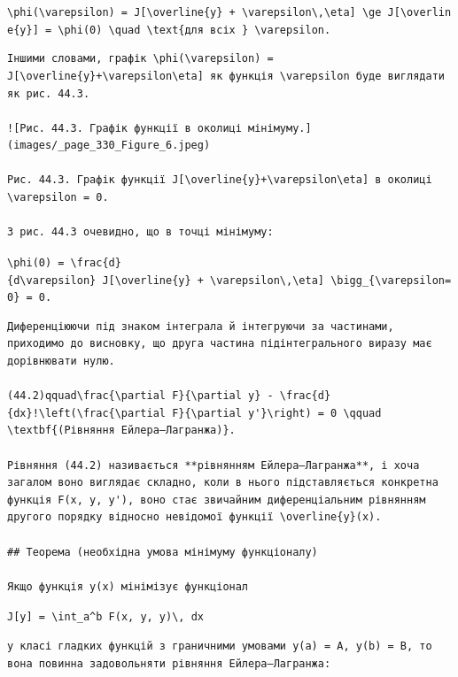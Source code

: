 \documentclass[
  ukrainian,
]{article}
\begin{document}
\texttt{\textbackslash{}phi(\textbackslash{}varepsilon)\ =\ J{[}\textbackslash{}overline\{y\}\ +\ \textbackslash{}varepsilon\textbackslash{},\textbackslash{}eta{]}\ \textbackslash{}ge\ J{[}\textbackslash{}overline\{y\}{]}\ =\ \textbackslash{}phi(0)\ \textbackslash{}quad\ \textbackslash{}text\{для\ всіх\ \}\ \textbackslash{}varepsilon.}

\begin{verbatim}
Іншими словами, графік \phi(\varepsilon) = J[\overline{y}+\varepsilon\eta] як функція \varepsilon буде виглядати як рис. 44.3.

![Рис. 44.3. Графік функції в околиці мінімуму.](images/_page_330_Figure_6.jpeg)

Рис. 44.3. Графік функції J[\overline{y}+\varepsilon\eta] в околиці \varepsilon = 0.

З рис. 44.3 очевидно, що в точці мінімуму:
\end{verbatim}

\texttt{\textbackslash{}phi\textquotesingle{}(0)\ =\ \textbackslash{}frac\{d\}\{d\textbackslash{}varepsilon\}\ J{[}\textbackslash{}overline\{y\}\ +\ \textbackslash{}varepsilon\textbackslash{},\textbackslash{}eta{]}\ \textbackslash{}bigg\textbar{}\_\{\textbackslash{}varepsilon=0\}\ =\ 0.}

\begin{verbatim}
Диференціюючи під знаком інтеграла й інтегруючи за частинами, приходимо до висновку, що друга частина підінтегрального виразу має дорівнювати нулю.

(44.2)qquad\frac{\partial F}{\partial y} - \frac{d}{dx}!\left(\frac{\partial F}{\partial y'}\right) = 0 \qquad \textbf{(Рівняння Ейлера–Лагранжа)}.

Рівняння (44.2) називається **рівнянням Ейлера–Лагранжа**, і хоча загалом воно виглядає складно, коли в нього підставляється конкретна функція F(x, y, y'), воно стає звичайним диференціальним рівнянням другого порядку відносно невідомої функції \overline{y}(x).

## Теорема (необхідна умова мінімуму функціоналу)

Якщо функція y(x) мінімізує функціонал
\end{verbatim}

\texttt{J{[}y{]}\ =\ \textbackslash{}int\_a\^{}b\ F(x,\ y,\ y\textquotesingle{})\textbackslash{},\ dx}

\begin{verbatim}
у класі гладких функцій з граничними умовами y(a) = A, y(b) = B, то вона повинна задовольняти рівняння Ейлера–Лагранжа:
\end{verbatim}
\end{document}
